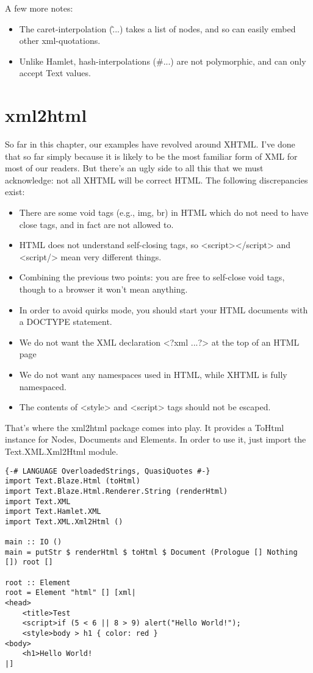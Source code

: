 A few more notes:

\begin{itemize}
\item The caret-interpolation (\^{...}) takes a list of nodes, and so can easily embed other xml-quotations.
\item Unlike Hamlet, hash-interpolations (\#{...}) are not polymorphic, and can only accept Text values.
\end{itemize}

\section{xml2html}

So far in this chapter, our examples have revolved around XHTML. I've done that so far simply because it is likely to be the most familiar form of XML for most of our readers. But there's an ugly side to all this that we must acknowledge: not all XHTML will be correct HTML. The following discrepancies exist:

\begin{itemize}
\item There are some void tags (e.g., img, br) in HTML which do not need to have close tags, and in fact are not allowed to.
\item HTML does not understand self-closing tags, so <script></script> and
<script/> mean very different things.
\item Combining the previous two points: you are free to self-close void tags, though to a browser it won't mean anything.
\item In order to avoid quirks mode, you should start your HTML documents with a DOCTYPE statement.
\item We do not want the XML declaration <?xml ...?> at the top of an HTML page
\item We do not want any namespaces used in HTML, while XHTML is fully namespaced.
\item The contents of <style> and <script> tags should not be escaped.
\end{itemize}
  
That's where the xml2html package comes into play. It provides a ToHtml instance for Nodes, Documents and Elements. In order to use it, just import the Text.XML.Xml2Html module.

\begin{lstlisting}
{-# LANGUAGE OverloadedStrings, QuasiQuotes #-}
import Text.Blaze.Html (toHtml)
import Text.Blaze.Html.Renderer.String (renderHtml)
import Text.XML
import Text.Hamlet.XML
import Text.XML.Xml2Html ()

main :: IO ()
main = putStr $ renderHtml $ toHtml $ Document (Prologue [] Nothing []) root []

root :: Element
root = Element "html" [] [xml|
<head>
    <title>Test
    <script>if (5 < 6 || 8 > 9) alert("Hello World!");
    <style>body > h1 { color: red }
<body>
    <h1>Hello World!
|]
\end{lstlisting}%

